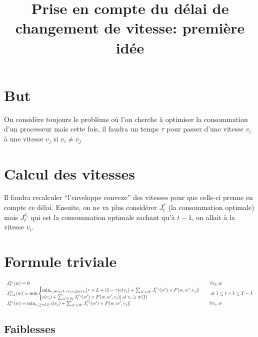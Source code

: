 \documentclass[10pt,a4paper]{article}
\title{Prise en compte du délai de changement de vitesse: première idée}
\begin{document}
\maketitle

\section{But}
On considère toujours le problème où l'on cherche à optimiser la
consommation d'un processeur mais cette fois, il faudra un temps
$\tau$ pour passer d'une vitesse $v_i$ à une vitesse $v_j$ si $v_i\neq
v_j$

\section{Calcul des vitesses}
Il faudra recalculer ``l'enveloppe convexe'' des vitesses pour que
celle-ci prenne en compte ce délai. Ensuite, on ne va plus considérer
$J_t^*$ (la consommation optimale) mais $J_t^{v_i}$ qui est la
consommation optimale sachant qu'à $t-1$, on allait à la vitesse $v_i$.

\section{Formule triviale}

\begin{equation}
  \resizebox{1.3\hsize}{!}{$
    \begin{array}{ll}
      J_T^{v_i}(w)=0 & \forall v_i, w\\
      J_{t-1}^{v_i}(w) = \min
      \begin{cases} 
        \min_{v_j\neq v_i, (1-\tau)v_j\geq w(1)} [\tau
        \times L+(1-\tau)c(v_j)+\sum_{w'\in\mathcal{W}}J_t^{v_j}(w')\times
        P(w,w',v_j)]\\
        c(v_i)+\sum_{w'\in\mathcal{W}}J_t^{v_i}(w')\times P(w,w',v_i)]
        \text{ si } v_i\geq w(1)

      \end{cases} & \text{ si } 1\leq t-1 \leq T-1 \\
      
      J_0^{v_i}(w) = \min_{v_j\geq
      w(1)}c(v_j)+\sum_{w'\in\mathcal{W}}J_1^{v_j}(w')\times
      P(w,w',v_j)] & \forall v_i,w 

    \end{array}
  $}
\end{equation}

\subsection{Faiblesses}
\end{document}
